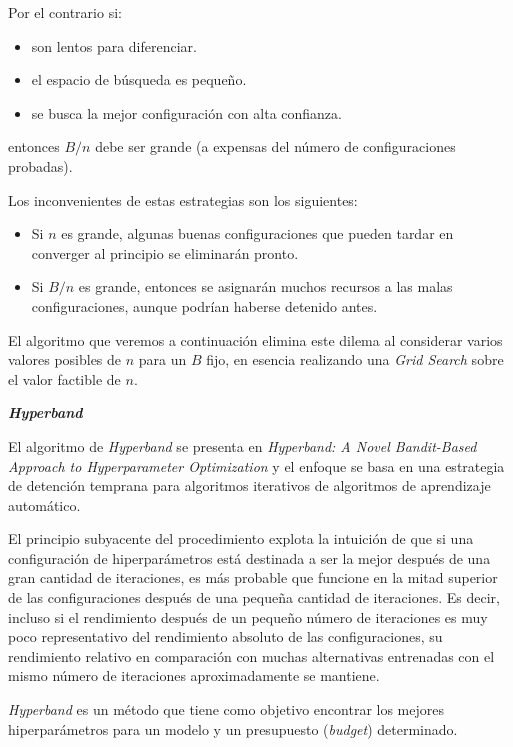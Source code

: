 \documentclass[a4paper,12pt]{article}
\begin{document}
\bigskip
Por el contrario si:
\begin{itemize}[noitemsep, topsep=2pt]
	\item son lentos para diferenciar.
	\item el espacio de búsqueda es pequeño.
	\item se busca la mejor configuración con alta confianza.
\end{itemize}
entonces $B/n$ debe ser grande (a expensas del número de configuraciones probadas).

\bigskip
Los inconvenientes de estas estrategias son los siguientes:
\begin{itemize}[noitemsep, topsep=2pt]
	\item Si $n$ es grande, algunas buenas configuraciones que pueden tardar en converger al principio se eliminarán pronto.
	\item Si $B/n$ es grande, entonces se asignarán muchos recursos a las malas configuraciones, aunque podrían haberse detenido antes.
\end{itemize}

El algoritmo que veremos a continuación elimina este dilema al considerar varios valores posibles de $n$ para un $B$ fijo, en esencia realizando una \textit{Grid Search} sobre el valor factible de $n$.

\hfill

\textbf{\textit{Hyperband}} \label{hyperband}

El algoritmo de \textit{Hyperband} se presenta en \textit{ Hyperband: A Novel Bandit-Based Approach to Hyperparameter Optimization} \citep{li2018hyperband} y el enfoque se basa en una estrategia de detención temprana para algoritmos iterativos de algoritmos de aprendizaje automático.

El principio subyacente del procedimiento explota la intuición de que si una configuración de hiperparámetros está destinada a ser la mejor después de una gran cantidad de iteraciones, es más probable que funcione en la mitad superior de las configuraciones después de una pequeña cantidad de iteraciones. Es decir, incluso si el rendimiento después de un pequeño número de iteraciones es muy poco representativo del rendimiento absoluto de las configuraciones, su rendimiento relativo en comparación con muchas alternativas entrenadas con el mismo número de iteraciones aproximadamente se mantiene.

\textit{Hyperband} es un método que tiene como objetivo encontrar los mejores hiperparámetros para un modelo y un presupuesto (\textit{budget}) determinado. 
\end{document}
